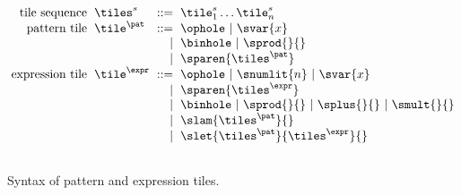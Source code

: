 \begin{figure}
  \vspace{-3px}
  \[
  \arraycolsep=3pt\begin{array}{rlrl}
    \text{tile sequence} & \tiles^s & ::= & \tile^s_1\dots\tile^s_n \\
    \text{pattern tile} & \tile^{\pat} & ::= &
      \ophole ~\vert~
      \svar{x} \\
    & & \vert &
      \binhole ~\vert~
      \sprod{}{} \\
    & & \vert &
      \sparen{\tiles^{\pat}} \\
    \text{expression tile} & \tile^{\expr} & ::= &
      \ophole ~\vert~
      \snumlit{n} ~\vert~
      \svar{x} \\
    & & \vert &
      \sparen{\tiles^{\expr}} \\
    & & \vert &
      \binhole ~\vert~
      \sprod{}{} ~\vert~
      \splus{}{} ~\vert~
      \smult{}{} \\
    & & \vert &
      \slam{\tiles^{\pat}}{} \\
    & & \vert &
      \slet{\tiles^{\pat}}{\tiles^{\expr}}{}\\\\ %
  \end{array}\]
  \caption{
    Syntax of pattern and expression tiles.
  }
  \label{fig:tile-syntax}
\end{figure}
